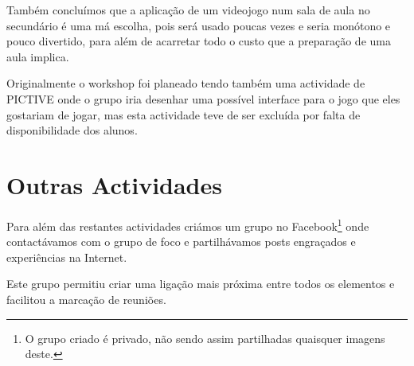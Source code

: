 Também concluímos que a aplicação de um videojogo num sala de aula no secundário é uma má escolha, pois será usado poucas vezes e seria monótono e pouco divertido, para além de acarretar todo o custo que a preparação de uma aula implica.

Originalmente o workshop foi planeado tendo também uma actividade de PICTIVE onde o grupo iria desenhar uma possível interface para o jogo que eles gostariam de jogar, mas esta actividade teve de ser excluída por falta de disponibilidade dos alunos.

\section{Outras Actividades}
Para além das restantes actividades criámos um grupo no Facebook\footnote{O grupo criado é privado, não sendo assim partilhadas quaisquer imagens deste.} onde contactávamos com o grupo de foco e partilhávamos posts engraçados e experiências na Internet.

Este grupo permitiu criar uma ligação mais próxima entre todos os elementos e facilitou a marcação de reuniões.